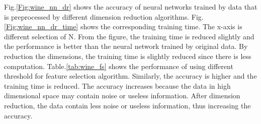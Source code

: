 \documentclass[11pt]{article}
\begin{document}
Fig.\ref{Fig:wine_nn_dr} shows the accuracy of neural networks trained by data that is preprocessed by different dimension reduction algorithms. Fig.\ref{Fig:wine_nn_dr_time} shows the corresponding training time. The x-axis is different selection of N. From the figure, the training time is reduced slightly and the performance is better than the neural network trained by original data. By reduction the dimensions, the training time is slightly reduced since there is less computation. Table.\ref{tab:wine_fs} shows the performance of using different threshold for feature selection algorithm. Similarly, the accuracy is higher and the training time is reduced. The accuracy increases because the data in high dimensional space may contain noise or useless information. After dimension reduction, the data contain less noise or useless information, thus increasing the accuracy.
\end{document}
